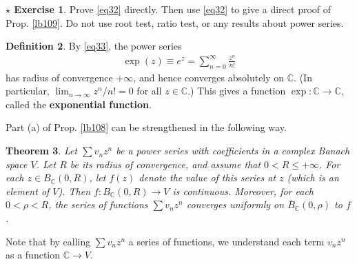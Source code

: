 \documentclass[12pt,b5paper,notitlepage]{article}
\theoremstyle{definition}
\newtheorem{df}{Definition}[section]
\newtheorem{sexe}[df]{$\star$ Exercise}
\theoremstyle{plain}
\newtheorem{thm}[df]{Theorem}
\newcommand{\ovl}{\overline}
\newcommand{\Cbb}{\mathbb C}
\numberwithin{equation}{section}
\begin{document}
\begin{sexe}
Prove \eqref{eq32} directly. Then use \eqref{eq32} to give a direct proof of Prop. \ref{lb109}. Do not use root test, ratio test, or any results about power series.
\end{sexe}







\begin{df}\label{lb107}
By \eqref{eq33}, the power series 
\begin{align*}
\exp(z)\equiv e^z=\sum_{n=0}^\infty \frac{z^n}{n!}
\end{align*}
has radius of convergence $+\infty$, and hence converges absolutely on $\Cbb$. (In particular, $\lim_{n\rightarrow\infty} z^n/n!=0$ for all $z\in\Cbb$.) This gives a function $\exp:\Cbb\rightarrow\Cbb$, called the \textbf{exponential function}.  
\end{df}















Part (a) of Prop. \ref{lb108} can be strengthened in the following way.

\begin{thm}\label{lb112}
Let $\sum v_n z^n$ be a power series with coefficients in a complex Banach space $V$. Let $R$ be its radius of convergence, and assume that $0<R\leq+\infty$. For each $z\in B_\Cbb(0,R)$, let $f(z)$  denote the value of this series at $z$ (which is an element of $V$). Then $f:B_\Cbb(0,R)\rightarrow V$ is continuous. Moreover,  for each $0<\rho<R$, the series of functions $\sum v_n z^n$ converges uniformly on $\ovl B_\Cbb(0,\rho)$ to $f$. 
\end{thm}

Note that by calling $\sum v_n z^n$ a series of functions, we understand each term $v_nz^n$ as a function $\Cbb\rightarrow V$.
\end{document}
